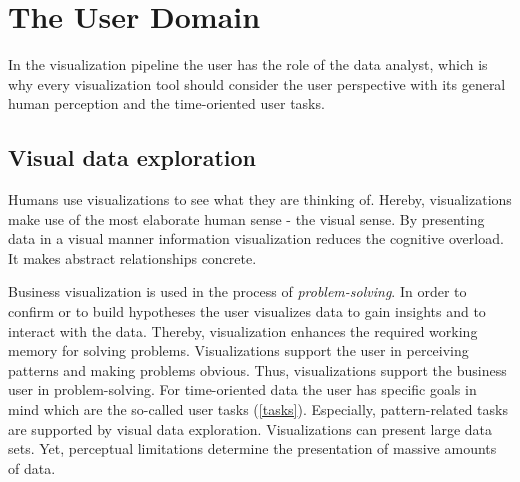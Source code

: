 \section{The User Domain} \label{user}
In the visualization pipeline the user has the role of the data analyst, which is why every visualization tool should consider the user perspective with its general human perception and the time-oriented user tasks.
\par
\subsection{Visual data exploration}
Humans use visualizations to see what they are thinking of. Hereby, visualizations make use of 
the most elaborate human sense - the visual sense. By presenting data in a visual manner information visualization reduces the cognitive overload. It makes abstract relationships concrete. 

Business visualization is used in the process of \textit{problem-solving}. In order to confirm or to build hypotheses the user visualizes data to gain insights and to interact with the data. Thereby, visualization enhances the required working memory for solving problems\cite{Card1999}. Visualizations support the user in perceiving patterns and making problems obvious. Thus, visualizations support the business user in problem-solving. For time-oriented data the user has specific goals in mind which are the so-called user tasks (\ref{tasks}). Especially, pattern-related tasks are supported by visual data exploration. Visualizations can present large data sets. Yet, perceptual limitations determine the presentation of massive amounts of data.

